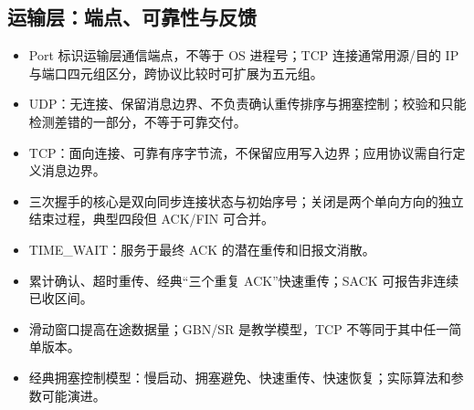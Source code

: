\documentclass[11pt,a4paper,openany]{ctexbook}
\begin{document}
\subsection{运输层：端点、可靠性与反馈}
\begin{itemize}
  \item Port 标识运输层通信端点，不等于 OS 进程号；TCP 连接通常用源/目的 IP 与端口四元组区分，跨协议比较时可扩展为五元组。
  \item UDP：无连接、保留消息边界、不负责确认重传排序与拥塞控制；校验和只能检测差错的一部分，不等于可靠交付。
  \item TCP：面向连接、可靠有序字节流，不保留应用写入边界；应用协议需自行定义消息边界。
  \item 三次握手的核心是双向同步连接状态与初始序号；关闭是两个单向方向的独立结束过程，典型四段但 ACK/FIN 可合并。
  \item TIME\_WAIT：服务于最终 ACK 的潜在重传和旧报文消散。
  \item 累计确认、超时重传、经典“三个重复 ACK”快速重传；SACK 可报告非连续已收区间。
  \item 滑动窗口提高在途数据量；GBN/SR 是教学模型，TCP 不等同于其中任一简单版本。
  \item 经典拥塞控制模型：慢启动、拥塞避免、快速重传、快速恢复；实际算法和参数可能演进。
\end{itemize}
\end{document}
